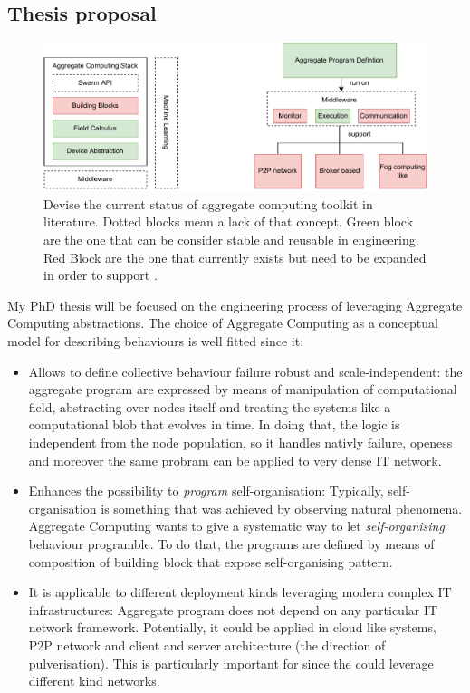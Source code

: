 \documentclass[11pt]{article}
\begin{document}
\subsection{Thesis proposal}
\begin{figure}
	\centering
	\includegraphics[width=\textwidth]{img/to-do-for-thesis.pdf}
	\caption{Devise the current status of aggregate computing toolkit in literature. Dotted blocks mean a lack of that concept. Green block are the one that can be consider stable and reusable in \cpws engineering. Red Block are the one that currently exists but need to be expanded in order to support \cpws.}
	\label{fig:current-state}
\end{figure}
My PhD thesis will be focused on the engineering process of \cpws leveraging Aggregate Computing abstractions. The choice of Aggregate Computing as a conceptual model for describing \cpws behaviours is well fitted since it:
\begin{itemize}
	\item Allows to define collective behaviour failure robust and scale-independent: the aggregate program are expressed by means of manipulation of computational field, abstracting over nodes itself and treating the systems like a computational blob that evolves in time. In doing that, the logic is independent from the node population, so it handles nativly failure, openess and moreover the same probram can be applied to very dense IT network.
	\item Enhances the possibility to \textit{program} self-organisation: Typically, self-organisation is something that was achieved by observing natural phenomena. Aggregate Computing wants to give a systematic way to let \textit{self-organising} behaviour programble. To do that, the programs are defined by means of composition of building block that expose self-organising pattern.
	\item It is applicable to different deployment kinds leveraging modern complex IT infrastructures: Aggregate program does not depend on any particular IT network framework. Potentially, it could be applied in cloud like systems, P2P network and client and server architecture (the direction of pulverisation). This is particularly important for \cpws since the could leverage different kind networks.
\end{itemize}
\end{document}
